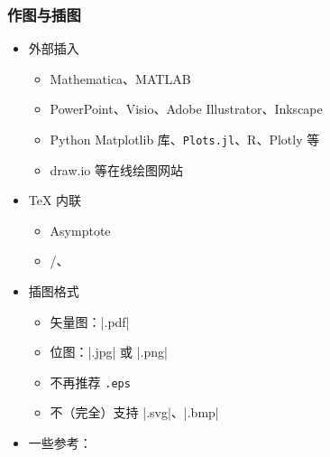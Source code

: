 \begin{frame}[fragile]
  \frametitle{作图与插图}
  \begin{itemize}
    \item 外部插入
  
      \begin{itemize}
        \item Mathematica、MATLAB
        \item PowerPoint、Visio、Adobe Illustrator、Inkscape
        \item Python Matplotlib 库、\texttt{Plots.jl}、R、Plotly 等
        \item draw.io  等在线绘图网站
      \end{itemize}
  
    \item \TeX{} 内联
  
      \begin{itemize}
        \item Asymptote
        \item \alert{/、}
      \end{itemize}
  
    \item 插图格式
  
      \begin{itemize}
        \item 矢量图：|.pdf|
        \item 位图：|.jpg| 或 |.png|
        \item \alert{不再推荐 \texttt{.eps}}
        \item 不（完全）支持 |.svg|、|.bmp|
      \end{itemize}
  
    \item 一些参考：
  \end{itemize}
\end{frame}


